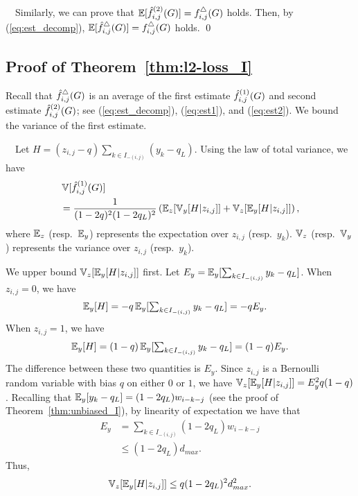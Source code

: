     \smallskip
    ~~Similarly, we can prove that $\operatorname{\mathbb{E}}[\hat{f}_{i,j}^{(2)}(G)] = f_{i,j}^\triangle(G)$ holds.
    Then, by (\ref{eq:est_decomp}), $\operatorname{\mathbb{E}}[\hat{f}_{i,j}^\triangle(G)] = f_{i,j}^\triangle(G)$ holds. \qed

\subsection{Proof of Theorem~\ref{thm:l2-loss_I}}
\label{sub:l2-loss_I_proof}

Recall that $\hat{f}_{i,j}^\triangle(G)$ is an average of the first estimate $\hat{f}_{i,j}^{(1)}(G)$ and second estimate $\hat{f}_{i,j}^{(2)}(G)$; see (\ref{eq:est_decomp}), (\ref{eq:est1}), and (\ref{eq:est2}). We bound the variance of the first estimate.

\smallskip
{}~~Let $H = (z_{i,j}-q)\sum_{k \in I_{-(i,j)}} (y_{k} - q_L)$.
Using the law of total variance, we have
\begin{align*}
    &\operatorname{\mathbb{V}}[\hat{f}_{i,j}^{(1)}(G)] \\
    &= \frac{1}{(1-2q)^2(1-2q_L)^2}\left(\operatorname{\mathbb{E}}_z[\operatorname{\mathbb{V}}_y[H | z_{i,j}]] + \operatorname{\mathbb{V}}_z[\operatorname{\mathbb{E}}_y[H | z_{i,j}]]\right),
\end{align*}
where $\operatorname{\mathbb{E}}_z$ (resp.~$\operatorname{\mathbb{E}}_y$) represents the expectation over $z_{i,j}$ (resp.~$y_{k}$).
$\operatorname{\mathbb{V}}_z$ (resp.~$\operatorname{\mathbb{V}}_y$) represents the variance over $z_{i,j}$ (resp.~$y_{k}$).

We upper bound $\operatorname{\mathbb{V}}_z[\operatorname{\mathbb{E}}_y[H | z_{i,j}]]$ first. Let $E_y = \operatorname{\mathbb{E}}_y[\sum_{k \in
I_{-(i,j)}} y_{k} \allowbreak -q_L]$. When $z_{i,j} = 0$, we have
\begin{align*}
\operatorname{\mathbb{E}}_y[H] &= -q\operatorname{\mathbb{E}}_y[\textstyle{\sum_{k \in I_{-(i,j)}} y_{k}-q_L}] = -qE_y.
\end{align*}
When $z_{i,j} = 1$, we have
\[
  \operatorname{\mathbb{E}}_y[H] = (1-q)\operatorname{\mathbb{E}}_y[\textstyle{\sum_{k \in I_{-(i,j)}} y_{k}-q_L}] = (1-q)E_y.
\]
The difference between these two quantities is $E_y$.
Since $z_{i,j}$ is a Bernoulli random variable with bias $q$ on either $0$ or
$1$, we have $\operatorname{\mathbb{V}}_z[\operatorname{\mathbb{E}}_y[H|z_{i,j}]] = E_y^2 q(1-q)$.
Recalling that $\operatorname{\mathbb{E}}_y[y_{k}-q_L] = (1-2q_L)w_{i-k-j}$ (see the proof of Theorem~\ref{thm:unbiased_I}), by linearity of expectation we have that
\begin{align*}
    E_y &= \sum_{k \in I_{-(i,j)}} (1-2q_L)w_{i-k-j} \\
    &\leq (1-2q_L) d_{max}.
\end{align*}
Thus,
\[
  \operatorname{\mathbb{V}}_z[\operatorname{\mathbb{E}}_y[H|z_{i,j}]] \leq q(1-2q_L)^2 d_{max}^2.
\]

